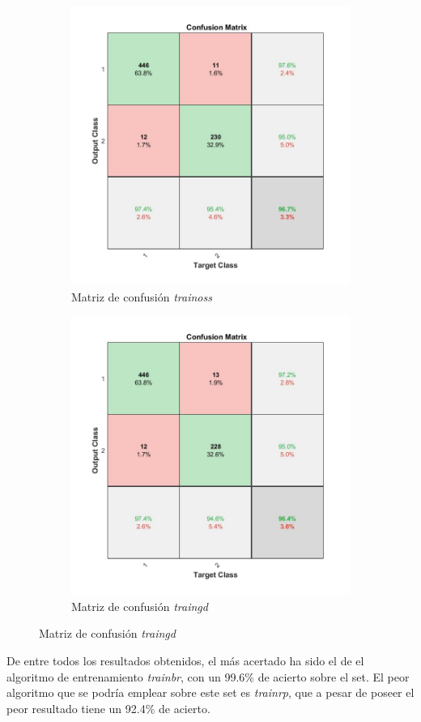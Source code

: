 \documentclass{article}
\begin{document}
\begin{figure}[H]
\begin{subfigure}{0.4\textwidth}
  \includegraphics[width=0.8\linewidth]{../images/I_ex4_confusion_cancer_dataset_trainoss.jpg}
  \caption{Matriz de confusión \textit{trainoss}}
 \end{subfigure}
 \begin{subfigure}{0.4\textwidth}
  \includegraphics[width=0.8\linewidth]{../images/I_ex4_confusion_cancer_dataset_trainrp.jpg}  
  \caption{Matriz de confusión \textit{traingd}}
 \end{subfigure}
\end{figure}

De entre todos los resultados obtenidos, el más acertado ha sido el de el
algoritmo de entrenamiento \textit{trainbr}, con un 99.6\% de acierto sobre el
set. El peor algoritmo que se podría emplear sobre este set es \textit{trainrp},
que a pesar de poseer el peor resultado tiene un 92.4\% de acierto.
\end{document}
